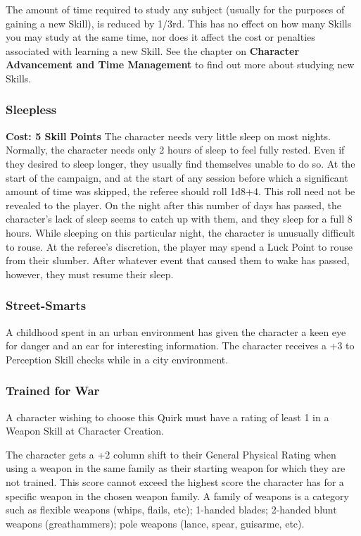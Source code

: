 \documentclass[oneside]{book}
\begin{document}
\begin{multicols}{2}
The amount of time required to study any subject (usually for the purposes of gaining a new Skill), is reduced by 1/3rd. This has no effect on how many Skills you may study at the same time, nor does it affect the cost or penalties associated with learning a new Skill. See the chapter on \textbf{Character Advancement and Time Management} to find out more about studying new Skills.

\subsubsection{Sleepless}
\textbf{\small Cost: 5 Skill Points}
The character needs very little sleep on most nights. Normally, the character needs only 2 hours of sleep to feel fully rested. Even if they desired to sleep longer, they usually find themselves unable to do so. At the start of the campaign, and at the start of any session before which a significant amount of time was skipped, the referee should roll 1d8+4. This roll need not be revealed to the player. On the night after this number of days has passed, the character's lack of sleep seems to catch up with them, and they sleep for a full 8 hours. While sleeping on this particular night, the character is unusually difficult to rouse. At the referee's discretion, the player may spend a Luck Point to rouse from their slumber. After whatever event that caused them to wake has passed, however, they must resume their sleep.

\subsubsection{Street-Smarts}
A childhood spent in an urban environment has given the character a keen eye for danger and an ear for interesting information. The character receives a +3 to Perception Skill checks while in a city environment. 

\subsubsection{Trained for War}
A character wishing to choose this Quirk must have a rating of least 1 in a Weapon Skill at Character Creation.

The character gets a +2 column shift to their General Physical Rating when using a weapon in the same family as their starting weapon for which they are not trained. This score cannot exceed the highest score the character has for a specific weapon in the chosen weapon family. A family of weapons is a category such as flexible weapons (whips, flails, etc); 1-handed blades; 2-handed blunt weapons (greathammers); pole weapons (lance, spear, guisarme, etc).


\end{multicols}
\end{document}
